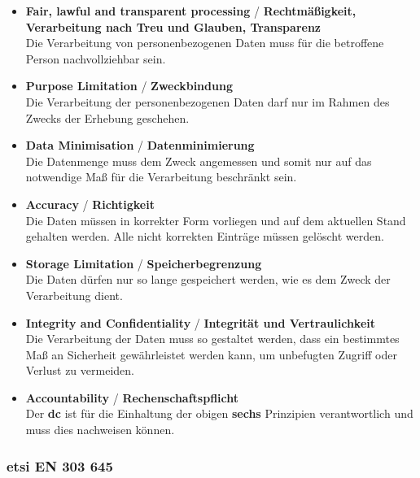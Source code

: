 \begin{itemize}
    \item \textbf{Fair, lawful and transparent processing} / \textbf{Rechtmäßigkeit, Verarbeitung nach Treu und Glauben, Transparenz} \\ Die Verarbeitung von personenbezogenen Daten muss für die betroffene Person nachvollziehbar sein.
    \item \textbf{Purpose Limitation} / \textbf{Zweckbindung} \\ Die Verarbeitung der personenbezogenen Daten darf nur im Rahmen des Zwecks der Erhebung geschehen.
    \item \textbf{Data Minimisation} / \textbf{Datenminimierung} \\ Die Datenmenge muss dem Zweck angemessen und somit nur auf das notwendige Maß für die Verarbeitung beschränkt sein.
    \item \textbf{Accuracy} / \textbf{Richtigkeit} \\ Die Daten müssen in korrekter Form vorliegen und auf dem aktuellen Stand gehalten werden. Alle nicht korrekten Einträge müssen gelöscht werden.
    \item \textbf{Storage Limitation} / \textbf{Speicherbegrenzung} \\ Die Daten dürfen nur so lange gespeichert werden, wie es dem Zweck der Verarbeitung dient.
    \item \textbf{Integrity and Confidentiality} / \textbf{Integrität und Vertraulichkeit} \\ Die Verarbeitung der Daten muss so gestaltet werden, dass ein bestimmtes Maß an Sicherheit gewährleistet werden kann, um unbefugten Zugriff oder Verlust zu vermeiden.
    \item \textbf{Accountability} / \textbf{Rechenschaftspflicht} \\ Der \textbf{\ac{dc}} ist für die Einhaltung der obigen \textbf{sechs} Prinzipien verantwortlich und muss dies nachweisen können.
\end{itemize}

\subsubsection{\acs{etsi} EN 303 645}
\label{sec:Grundlagen:ssec:Rechtliche Rahmenbedingungen:sssec:ETSI EN 303 645}

